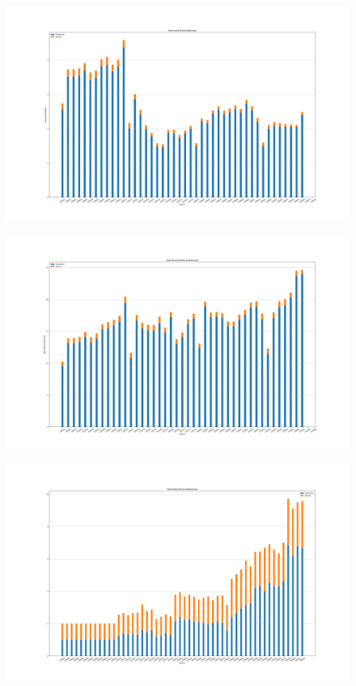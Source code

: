 \documentclass[12pt]{article}
\begin{document}
    \begin{figure}
        \includegraphics[width=\linewidth]{../data/figs/Revenue(B Dollar)-Balanced.png}
    \end{figure}
    \begin{figure}
        \includegraphics[width=\linewidth]{../data/figs/Real Revenue(Hemat)-Balanced.png}
    \end{figure}
    \begin{figure}
        \includegraphics[width=\linewidth]{../data/figs/Normalized Revenue-Balanced.png}
    \end{figure}
\end{document}
